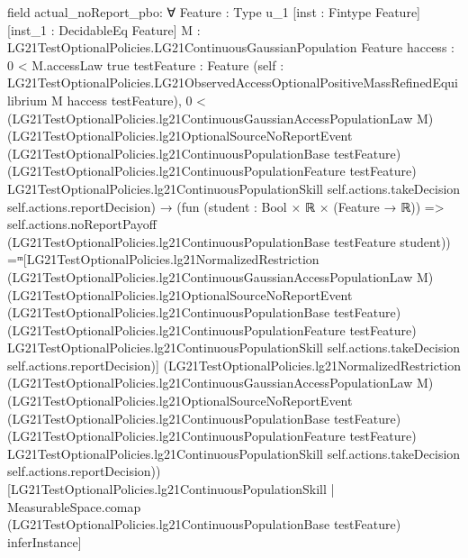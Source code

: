 \documentclass[10pt]{article}
\begin{document}
\begin{ReviewVerbatim}
field actual_noReport_pbo:
∀ {Feature : Type u_1} [inst : Fintype Feature] [inst_1 : DecidableEq Feature]
  {M : LG21TestOptionalPolicies.LG21ContinuousGaussianPopulation Feature} {haccess : 0 < M.accessLaw {true}}
  {testFeature : Feature}
  (self : LG21TestOptionalPolicies.LG21ObservedAccessOptionalPositiveMassRefinedEquilibrium M haccess testFeature),
  0 <
      (LG21TestOptionalPolicies.lg21ContinuousGaussianAccessPopulationLaw M)
        (LG21TestOptionalPolicies.lg21OptionalSourceNoReportEvent
          (LG21TestOptionalPolicies.lg21ContinuousPopulationBase testFeature)
          (LG21TestOptionalPolicies.lg21ContinuousPopulationFeature testFeature)
          LG21TestOptionalPolicies.lg21ContinuousPopulationSkill self.actions.takeDecision
          self.actions.reportDecision) →
    (fun (student : Bool × ℝ × (Feature → ℝ)) =>
        self.actions.noReportPayoff
          (LG21TestOptionalPolicies.lg21ContinuousPopulationBase testFeature
            student)) =ᵐ[LG21TestOptionalPolicies.lg21NormalizedRestriction
        (LG21TestOptionalPolicies.lg21ContinuousGaussianAccessPopulationLaw M)
        (LG21TestOptionalPolicies.lg21OptionalSourceNoReportEvent
          (LG21TestOptionalPolicies.lg21ContinuousPopulationBase testFeature)
          (LG21TestOptionalPolicies.lg21ContinuousPopulationFeature testFeature)
          LG21TestOptionalPolicies.lg21ContinuousPopulationSkill self.actions.takeDecision self.actions.reportDecision)]
      (LG21TestOptionalPolicies.lg21NormalizedRestriction
          (LG21TestOptionalPolicies.lg21ContinuousGaussianAccessPopulationLaw M)
          (LG21TestOptionalPolicies.lg21OptionalSourceNoReportEvent
            (LG21TestOptionalPolicies.lg21ContinuousPopulationBase testFeature)
            (LG21TestOptionalPolicies.lg21ContinuousPopulationFeature testFeature)
            LG21TestOptionalPolicies.lg21ContinuousPopulationSkill self.actions.takeDecision
            self.actions.reportDecision))[LG21TestOptionalPolicies.lg21ContinuousPopulationSkill |
        MeasurableSpace.comap (LG21TestOptionalPolicies.lg21ContinuousPopulationBase testFeature) inferInstance]
\end{ReviewVerbatim}
\end{document}
